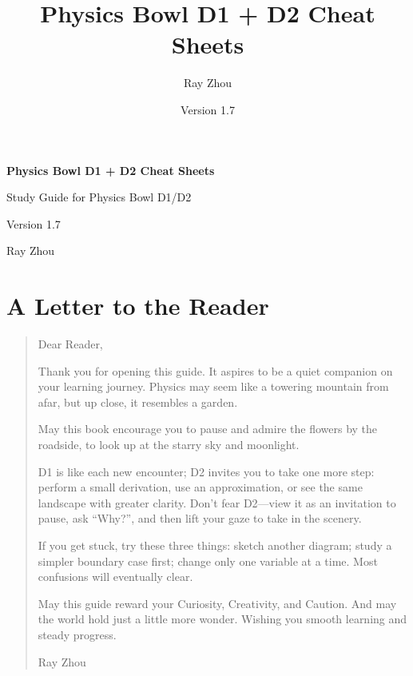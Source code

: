 ﻿\documentclass[12pt,a4paper]{article}
\title{Physics Bowl D1 + D2 Cheat Sheets}
\author{Ray Zhou}
\date{Version 1.7}
\newif\ifpublicrelease
\begin{document}
\begin{titlepage}
\thispagestyle{empty}
\centering
\vspace*{1.6cm}
{\Huge\bfseries Physics Bowl D1 + D2 Cheat Sheets\par}
\vspace{0.6cm}
{\Large Study Guide for Physics Bowl D1/D2\par}
\vspace{1.2cm}
{\Large Version 1.7\par}
\vfill
{\large Ray Zhou\par}
\vspace*{0.6cm}
\end{titlepage}
\ifpublicrelease
  \begin{center}
    \vspace{0.5em}
    {\small This work contains original problems and original explanatory text. Contest references in \textit{Practice Pointers} are metadata only (Contest/Year/Division/Problem/Page) and do not reproduce source items. Third-party contest materials remain the property of their respective owners.}
  \end{center}
\fi

\pagestyle{plain}

\section*{A Letter to the Reader}
\begin{quote}
\raggedright
Dear Reader,\par\smallskip

Thank you for opening this guide. It aspires to be a quiet companion on your learning journey. Physics may seem like a towering mountain from afar, but up close, it resembles a garden.\par\medskip
May this book encourage you to pause and admire the flowers by the roadside, to look up at the starry sky and moonlight.

D1 is like each new encounter; D2 invites you to take one more step: perform a small derivation, use an approximation, or see the same landscape with greater clarity. Don't fear D2---view it as an invitation to pause, ask ``Why?'', and then lift your gaze to take in the scenery.\par\medskip
If you get stuck, try these three things: sketch another diagram; study a simpler boundary case first; change only one variable at a time. Most confusions will eventually clear.

May this guide reward your Curiosity, Creativity, and Caution. And may the world hold just a little more wonder. Wishing you smooth learning and steady progress.\par\medskip
\begin{flushright}
Ray Zhou
\end{flushright}
\end{quote}
\clearpage
\end{document}
